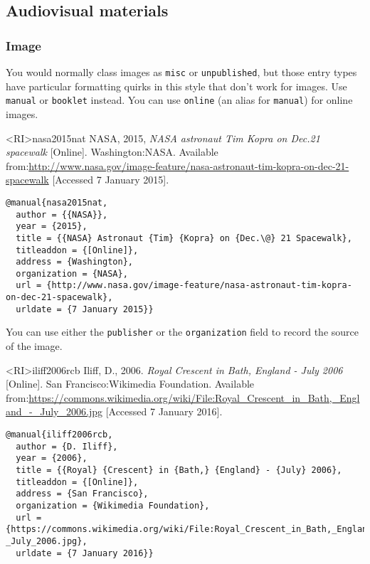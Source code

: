 \documentclass[10pt,a4paper]{article}
\newenvironment{tips}{%
  \begin{list}{\makebox[2em][c]{\faLightbulbO}}{%
    \setlength{\leftmargin}{2em}
    \setlength{\labelwidth}{2em}
    \setlength{\labelsep}{0pt}}
}{\end{list}}
\begin{document}
\subsection{Audiovisual materials}

\subsubsection*{Image}

\begin{tips}\item You would normally class images as \texttt{misc} or \texttt{unpublished}, but those entry types have particular formatting quirks in this style that don't work for images. Use \texttt{manual} or \texttt{booklet} instead. You can use \texttt{online} (an alias for \texttt{manual}) for online images.\end{tips}

\begin{bibexbox}<RI>{nasa2015nat}
   NASA, 2015, \emph{NASA astronaut Tim Kopra on Dec.\@ 21 spacewalk} [Online]. Washington:\@ NASA. Available from:\@ \url{http://www.nasa.gov/image-feature/nasa-astronaut-tim-kopra-on-dec-21-spacewalk} [Accessed 7 January 2015].
  \tcblower
\begin{Verbatim}
@manual{nasa2015nat,
  author = {{NASA}},
  year = {2015},
  title = {{NASA} Astronaut {Tim} {Kopra} on {Dec.\@} 21 Spacewalk},
  titleaddon = {[Online]},
  address = {Washington},
  organization = {NASA},
  url = {http://www.nasa.gov/image-feature/nasa-astronaut-tim-kopra-on-dec-21-spacewalk},
  urldate = {7 January 2015}}
\end{Verbatim}
\end{bibexbox}

\begin{tips}\item You can use either the \texttt{publisher} or the \texttt{organization} field to
record the source of the image.\end{tips}

\begin{bibexbox}<RI>{iliff2006rcb}
   Iliff, D., 2006. \emph{Royal Crescent in Bath, England - July 2006} [Online]. San Francisco:\@ Wikimedia Foundation. Available from:\@ \url{https://commons.wikimedia.org/wiki/File:Royal_Crescent_in_Bath,_England_-_July_2006.jpg} [Accessed 7 January 2016].
  \tcblower
\begin{Verbatim}
@manual{iliff2006rcb,
  author = {D. Iliff},
  year = {2006},
  title = {{Royal} {Crescent} in {Bath,} {England} - {July} 2006},
  titleaddon = {[Online]},
  address = {San Francisco},
  organization = {Wikimedia Foundation},
  url = {https://commons.wikimedia.org/wiki/File:Royal_Crescent_in_Bath,_England_-_July_2006.jpg},
  urldate = {7 January 2016}}
\end{Verbatim}
\end{bibexbox}
\end{document}
